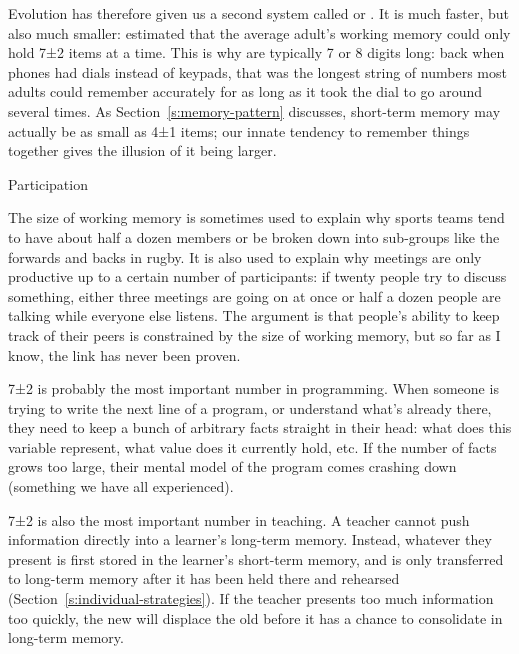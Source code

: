 Evolution has therefore given us a second system called
 or . It is much faster, but also much smaller:
\cite{Mill1956} estimated that the average adult's working memory
could only hold 7±2 items at a time. This is why  are typically 7 or 8 digits long: back when
phones had dials instead of keypads, that was the longest string of
numbers most adults could remember accurately for as long as it took
the dial to go around several times. As Section~\ref{s:memory-pattern}
discusses, short-term memory may actually be as small as 4±1 items;
our innate tendency to remember things together gives the illusion of
it being larger.

\begin{aside}{Participation}

The size of working memory is sometimes used to explain why sports
teams tend to have about half a dozen members or be broken down into
sub-groups like the forwards and backs in rugby. It is also used to
explain why meetings are only productive up to a certain number of
participants: if twenty people try to discuss something, either three
meetings are going on at once or half a dozen people are talking while
everyone else listens. The argument is that people's ability to keep
track of their peers is constrained by the size of working memory, but
so far as I know, the link has never been proven.

\end{aside}

7±2 is probably the most important number in programming. When
someone is trying to write the next line of a program, or understand
what's already there, they need to keep a bunch of arbitrary facts
straight in their head: what does this variable represent, what value
does it currently hold, etc. If the number of facts grows too large,
their mental model of the program comes crashing down (something we have
all experienced).

7±2 is also the most important number in teaching. A teacher cannot
push information directly into a learner's long-term memory. Instead,
whatever they present is first stored in the learner's short-term
memory, and is only transferred to long-term memory after it has been
held there and rehearsed (Section~\ref{s:individual-strategies}). If the
teacher presents too much information too quickly, the new will
displace the old before it has a chance to consolidate in long-term
memory.

